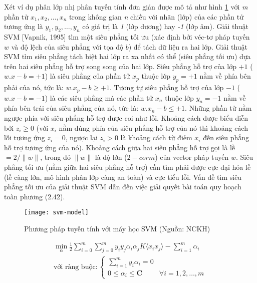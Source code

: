 Xét ví dụ phân lớp nhị phân tuyến tính đơn giản \cite{khang2019} được mô tả như hình \ref{fig:2.10} với \emph{m} phần tử $x_1, x_2, \dots, x_n$ trong không gian \emph{n} chiều với nhãn (lớp) của các phần tử tương ứng là $y_1, y_2, \dots, y_n$ có giá trị là \emph{1} (lớp dương) hay \emph{-1} (lớp âm). Giải thuật SVM [Vapnik, 1995] tìm một siêu phẳng tối ưu (xác định bởi véc-tơ pháp tuyến $w$ và độ lệch của siêu phẳng với tọa độ $b$) để tách dữ liệu ra hai lớp. Giải thuật SVM tìm siêu phẳng tách biệt hai lớp ra xa nhất có thể (siêu phẳng tối ưu) dựa trên hai siêu phẳng hỗ trợ song song của hai lớp. Siêu phẳng hỗ trợ của lớp $+1$ ($w.x - b = +1$) là siêu phẳng của phần tử $x_p$ thuộc lớp $y_p = +1$ nằm về phía bên phải của nó, tức là: $w.x_p - b \geq +1$. Tương tự siêu phẳng hỗ trợ của lớp $-1$ ($w.x - b = -1$) là các siêu phẳng mà các phần tử $x_n$ thuộc lớp $y_n = -1$ nằm về phía bên trái của siêu phẳng của nó, tức là: $w.x_n - b \leq +1$. Những phần tử nằm ngược phía với siêu phẳng hỗ trợ được coi như lỗi. Khoảng cách được biểu diễn bởi $z_i \geq 0$ (với $x_i$ nằm đúng phía của siêu phẳng hỗ trợ của nó thì khoảng cách lỗi tương ứng $z_i = 0$, ngược lại $z_i > 0$ là khoảng cách từ điẻm $x_i$ đến siêu phẳng hỗ trợ tương ứng của nó). Khoảng cách giữa hai siêu phẳng hỗ trợ gọi là lề $= 2/\|w\|$, trong đó $\|w\|$ là độ lớn ($2-corm$) của vector pháp tuyến $w$. Siêu phẳng tối ưu (nằm giữa hai siêu phẳng hỗ trợ) cần tìm phải được cực đại hóa lề (lề càng lớn, mô hình phân lớp càng an toàn) và cực tiểu lỗi. Vấn đề tìm siêu phẳng tối ưu của giải thuật SVM dẫn đến việc giải quyết bài toán quy hoạch toàn phương (2.42).

\begin{figure}[h]
	\centering
	\texttt{[image: svm-model]}
	\caption[Phương pháp tuyến tính với máy học SVM]{Phương pháp tuyến tính với máy học SVM (Nguồn: NCKH)}
	\label{fig:2.10}
\end{figure}

\begin{equation}\label{eq:svm}
	\begin{aligned}
		\min_{\alpha}\frac{1}{2} \sum_{i=0}^m \sum_{j=0}^m y_i y_j \alpha_i \alpha_j K \langle x_i x_j \rangle - \sum_{i=1}^m \alpha_i \\
		\text{với ràng buộc}:
		\begin{cases} 
			\displaystyle\sum_{i=1}^m y_i \alpha_i = 0\\
			0 \leq \alpha_i \leq \boldsymbol{C} & \forall i = 1,2, \dots, m
		\end{cases}
	\end{aligned}
\end{equation}

